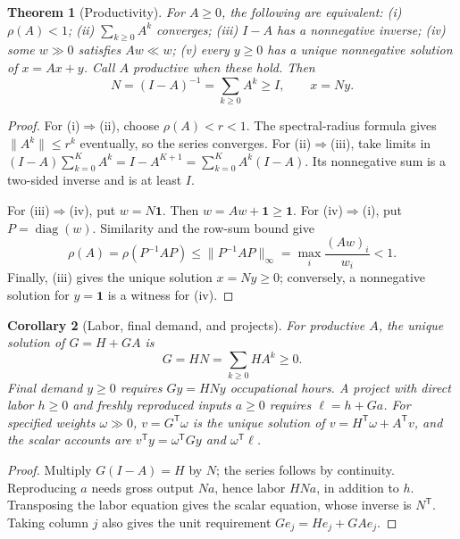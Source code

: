 \documentclass[11pt,a4paper]{article}
\newtheorem{theorem}{Theorem}[section]
\newtheorem{corollary}[theorem]{Corollary}
\begin{document}
\begin{theorem}[Productivity]
For $A\geq0$, the following are equivalent: (i) $\rho(A)<1$; (ii) $\sum_{k\geq0}A^k$ converges; (iii) $I-A$ has a nonnegative inverse; (iv) some $w\gg0$ satisfies $Aw\ll w$; (v) every $y\geq0$ has a unique nonnegative solution of $x=Ax+y$. Call $A$ productive when these hold. Then
\begin{equation}
N=(I-A)^{-1}=\sum_{k\geq0}A^k\geq I,\qquad x=Ny.
\end{equation}
\end{theorem}
\begin{proof}
For (i)$\Rightarrow$(ii), choose $\rho(A)<r<1$. The spectral-radius formula gives $\|A^k\|\leq r^k$ eventually, so the series converges. For (ii)$\Rightarrow$(iii), take limits in $(I-A)\sum_{k=0}^{K}A^k=I-A^{K+1}=\sum_{k=0}^{K}A^k(I-A)$. Its nonnegative sum is a two-sided inverse and is at least $I$.

For (iii)$\Rightarrow$(iv), put $w=N\mathbf1$. Then $w=Aw+\mathbf1\geq\mathbf1$. For (iv)$\Rightarrow$(i), put $P=\operatorname{diag}(w)$. Similarity and the row-sum bound give
\begin{equation}
\rho(A)=\rho(P^{-1}AP)\leq\|P^{-1}AP\|_\infty=\max_i\frac{(Aw)_i}{w_i}<1.
\end{equation}
Finally, (iii) gives the unique solution $x=Ny\geq0$; conversely, a nonnegative solution for $y=\mathbf1$ is a witness for (iv).
\end{proof}

\begin{corollary}[Labor, final demand, and projects]
For productive $A$, the unique solution of $G=H+GA$ is
\begin{equation}
G=HN=\sum_{k\geq0}HA^k\geq0.
\end{equation}
Final demand $y\geq0$ requires $Gy=HNy$ occupational hours. A project with direct labor $h\geq0$ and freshly reproduced inputs $a\geq0$ requires $\ell=h+Ga$. For specified weights $\omega\gg0$, $v=G^{\mathsf T}\omega$ is the unique solution of $v=H^{\mathsf T}\omega+A^{\mathsf T}v$, and the scalar accounts are $v^{\mathsf T}y=\omega^{\mathsf T}Gy$ and $\omega^{\mathsf T}\ell$.
\end{corollary}
\begin{proof}
Multiply $G(I-A)=H$ by $N$; the series follows by continuity. Reproducing $a$ needs gross output $Na$, hence labor $HNa$, in addition to $h$. Transposing the labor equation gives the scalar equation, whose inverse is $N^{\mathsf T}$. Taking column $j$ also gives the unit requirement $Ge_j=He_j+GAe_j$.
\end{proof}
\end{document}
